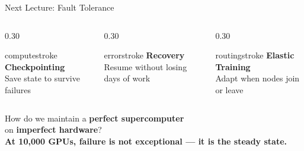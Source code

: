 \documentclass[aspectratio=169, 12pt]{beamer}
\begin{document}
\begin{frame}{Next Lecture: Fault Tolerance}

\footnotesize
\begin{columns}[c]
  \begin{column}{0.30\textwidth}
    \centering
    \begin{mlsyscard}{computestroke}
    {\normalsize\bfseries Checkpointing}\\[0.1cm]
    {\scriptsize Save state to survive failures}
    \end{mlsyscard}
  \end{column}
  \begin{column}{0.30\textwidth}
    \centering
    \begin{mlsyscard}{errorstroke}
    {\normalsize\bfseries Recovery}\\[0.1cm]
    {\scriptsize Resume without losing days of work}
    \end{mlsyscard}
  \end{column}
  \begin{column}{0.30\textwidth}
    \centering
    \begin{mlsyscard}{routingstroke}
    {\normalsize\bfseries Elastic Training}\\[0.1cm]
    {\scriptsize Adapt when nodes join or leave}
    \end{mlsyscard}
  \end{column}
\end{columns}

\vspace{0.3cm}
\centering
{\normalsize How do we maintain a \textbf{perfect supercomputer}\\on \textbf{imperfect hardware}?}\\[0.1cm]
{\small\textbf{At 10,000 GPUs, failure is not exceptional --- it is the steady state.}}

\end{frame}
\end{document}

